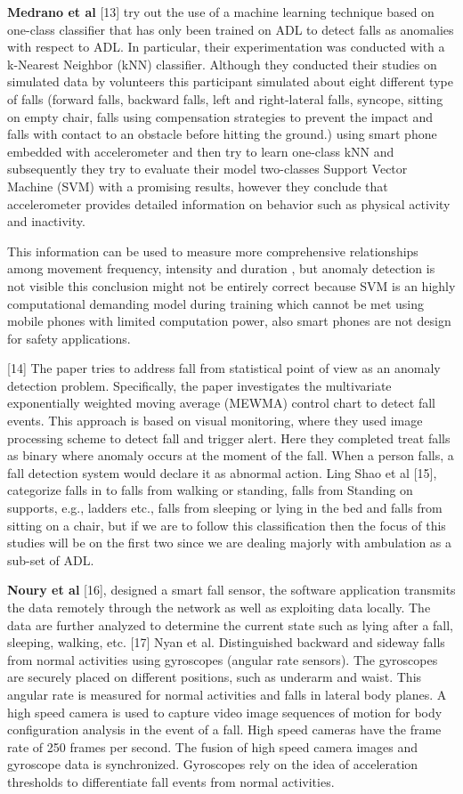 \documentclass[a4paper, parskip=full]{scrartcl}
\begin{document}
\textbf{
Medrano et al} [13] try out the use of a machine learning technique based on one-class classifier that has only been trained on ADL to detect falls as anomalies with respect to ADL. In particular, their experimentation was conducted with a k-Nearest Neighbor (kNN) classifier. Although they conducted their studies on simulated data by volunteers this participant simulated about eight different type of falls (forward falls, backward falls, left and right-lateral falls, syncope, sitting on empty chair, falls using compensation strategies to prevent the impact and falls with contact to an obstacle before hitting the ground.) using smart phone embedded with accelerometer and then try to learn one-class kNN and subsequently they try to evaluate their model two-classes Support Vector Machine (SVM) with a promising results, however they conclude that accelerometer provides detailed information on behavior such as physical activity and inactivity. 

This information can be used to measure more comprehensive relationships among movement frequency, intensity and duration , but anomaly detection is not visible this conclusion might not be entirely correct because SVM is an highly computational demanding model during training which cannot be met using mobile phones with limited computation power, also smart phones are not design for safety applications.

[14] The paper tries to address fall from statistical point of view as an anomaly detection problem. Specifically, the paper investigates the multivariate exponentially weighted moving average (MEWMA) control chart to detect fall events. This approach is based on visual monitoring, where they used image processing scheme to detect fall and trigger alert. Here they completed treat falls as binary where anomaly occurs at the moment of the fall. When a person falls, a fall detection system would declare it as abnormal action. Ling Shao et al [15], categorize falls in to falls from walking or standing, falls from Standing on supports, e.g., ladders etc., falls from sleeping or lying in the bed and falls from sitting on a chair, but if we are to follow this classification then the focus of this studies will be on the first two since we are dealing majorly with ambulation as a sub-set of ADL.

\textbf{Noury et al} [16], designed a smart fall sensor, the software application transmits the data remotely through the network as well as exploiting data locally. The data are further analyzed to determine the current state such as lying after a fall, sleeping, walking, etc. [17] Nyan et al.  Distinguished backward and sideway falls from normal activities using gyroscopes (angular rate sensors). The gyroscopes are securely placed on different positions, such as underarm and waist. This angular rate is measured for normal activities and falls in lateral body planes. A high speed camera is used to capture video image sequences of motion for body configuration analysis in the event of a fall. High speed cameras have the frame rate of 250 frames per second. The fusion of high speed camera images and gyroscope data is synchronized. Gyroscopes rely on the idea of acceleration thresholds to differentiate fall events from normal activities.
\end{document}

